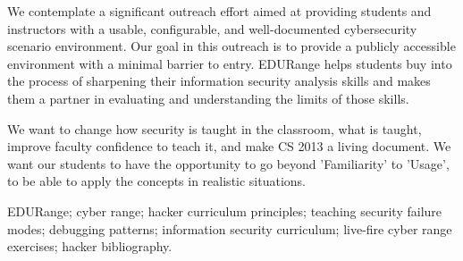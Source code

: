 \documentclass[11pt]{report}
\begin{document}
We contemplate a significant outreach effort aimed at providing
students and instructors with a usable, configurable, and
well-documented cybersecurity scenario environment.  Our goal in this
outreach is to provide a publicly accessible environment with a
minimal barrier to entry.  EDURange helps students buy into the
process of sharpening their information security analysis skills and
makes them a partner in evaluating and understanding the limits of
those skills.

We want to change how security is taught in the classroom, what is taught, improve 
faculty confidence to teach it, and make CS 2013 a living document.  We want our students to 
have the opportunity to go beyond 
'Familiarity' to 'Usage', to be able to apply the concepts in realistic situations.



 EDURange; cyber range; hacker curriculum
principles; teaching security failure modes; debugging patterns;
information security curriculum; live-fire cyber range exercises;
hacker bibliography.
\end{document}
